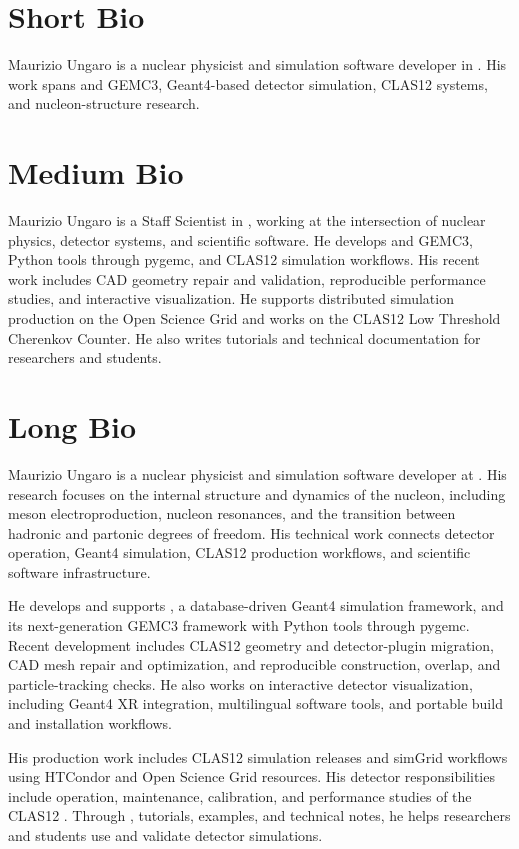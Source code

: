 \documentclass[11pt,letterpaper]{article}
\begin{document}

\section*{Short Bio}
Maurizio Ungaro is a nuclear physicist and simulation software developer in
\MauriHallB{}. His work spans \MauriGEMC{} and GEMC3, Geant4-based detector
simulation, CLAS12 systems, and nucleon-structure research.

\section*{Medium Bio}
Maurizio Ungaro is a Staff Scientist in \MauriHallB{}, working at the
intersection of nuclear physics, detector systems, and scientific software.
He develops \MauriGEMC{} and GEMC3, Python tools through pygemc, and CLAS12
simulation workflows. His recent work includes CAD geometry repair and
validation, reproducible performance studies, and interactive visualization.
He supports distributed simulation production on the Open Science Grid and
works on the CLAS12 Low Threshold Cherenkov Counter. He also writes tutorials
and technical documentation for researchers and students.

\section*{Long Bio}
Maurizio Ungaro is a nuclear physicist and simulation software developer at
\MauriJLab{}. His research focuses on the internal structure and dynamics of
the nucleon, including meson electroproduction, nucleon resonances, and the transition between
hadronic and partonic degrees of freedom. His technical work connects detector
operation, Geant4 simulation, CLAS12 production workflows, and scientific
software infrastructure.

He develops and supports \MauriGEMC{}, a database-driven Geant4 simulation
framework, and its next-generation GEMC3 framework with Python tools through
pygemc. Recent development includes CLAS12 geometry and detector-plugin
migration, CAD mesh repair and optimization, and reproducible construction,
overlap, and particle-tracking checks. He also works on interactive detector
visualization, including Geant4 XR integration, multilingual software tools,
and portable build and installation workflows.

His production work includes CLAS12 simulation releases and simGrid workflows
using HTCondor and Open Science Grid resources. His detector responsibilities
include operation, maintenance, calibration, and performance studies of the
CLAS12 \MauriLTCC{}. Through \MauriGeantFourJLab{}, tutorials, examples, and
technical notes, he helps researchers and students use and validate detector
simulations.
\end{document}
